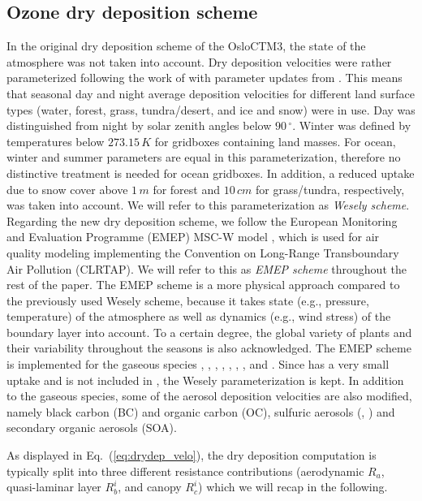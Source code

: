 \documentclass[gmd, manuscript]{copernicus}
\begin{document}
\subsection{Ozone dry deposition scheme}
\label{subsec:DryDep}
In the original dry deposition scheme of the OsloCTM3, the state of the atmosphere was not taken into account. Dry deposition velocities were rather parameterized following the work of \citet{AE:Wesely1989} with parameter updates from \citet{JGR:Hough1991}. This means that seasonal day and night average deposition velocities for different land surface types (water, forest, grass, tundra/desert, and ice and snow) were in use. Day was distinguished from night by solar zenith angles below $90\,\unit{^\circ}$. Winter was defined by temperatures below $273.15\,\unit{K}$ for gridboxes containing land masses. For ocean, winter and summer parameters are equal in this parameterization, therefore no distinctive treatment is needed for ocean gridboxes. In addition, a reduced uptake due to snow cover above $1\,\unit{m}$ for forest and $10\,\unit{cm}$ for grass/tundra, respectively, was taken into account. We will refer to this parameterization as \emph{Wesely scheme}.\\

Regarding the new dry deposition scheme, we follow the European Monitoring and Evaluation Programme (EMEP) MSC-W model \citep{WASP:Simpson2003,ACP:Simpson2012}, which is used for air quality modeling implementing the Convention on Long-Range Transboundary Air Pollution (CLRTAP). We will refer to this as \emph{EMEP scheme} throughout the rest of the paper. The EMEP scheme is a more physical approach compared to the previously used Wesely scheme, because it takes state (e.g., pressure, temperature)  of the atmosphere as well as dynamics (e.g., wind stress) of the boundary layer into account. To a certain degree, the global variety of plants and their variability throughout the seasons is also acknowledged. The EMEP scheme is implemented for the gaseous species , , , , , , , and . Since  has a very small uptake and is not included in \citet{WASP:Simpson2003,ACP:Simpson2012}, the Wesely parameterization is kept. In addition to the gaseous species, some of the aerosol deposition velocities are also modified, namely black carbon (BC) and organic carbon (OC), sulfuric aerosols (, ) and secondary organic aerosols (SOA).

As displayed in Eq.~(\ref{eq:drydep_velo}), the dry deposition computation is typically split into three different resistance contributions (aerodynamic $R_a$, quasi-laminar layer $R^i_b$, and canopy $R^i_c$) which we will recap in the following.
\end{document}
